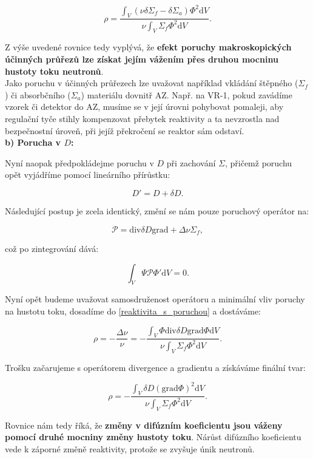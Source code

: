 \begin{equation}
  \boxed{
  \rho = \dfrac{\int_V (\nu \delta \Sigma_f - \delta \Sigma_a) \Phi^2 \text{d}V}{\nu \int_V \Sigma_f \Phi^2 \text{d}V}.
  \label{reaktivita_1G_Sigma}}
\end{equation}

Z výše uvedené rovnice tedy vyplývá, že \textbf{efekt poruchy makroskopických účinných průřezů lze získat jejím vážením přes druhou mocninu hustoty toku neutronů}.\\

Jako poruchu v účinných průřezech lze uvažovat například vkládání štěpného ($\Sigma_f$) či absorbčního ($\Sigma_a$) materiálu dovnitř AZ. Např. na VR-1, pokud zavádíme vzorek či detektor do AZ, musíme se v její úrovni pohybovat pomaleji, aby regulační tyče stihly kompenzovat přebytek reaktivity a ta nevzrostla nad bezpečnostní úroveň, při jejíž překročení se reaktor sám odstaví.\\

\textbf{b) Porucha v $D$:}

Nyní naopak předpokládejme poruchu v $D$ při zachování $\Sigma$, přičemž poruchu opět vyjádříme pomocí lineárního přírůstku:

$$D' = D + \delta D.$$

Následující postup je zcela identický, změní se nám pouze poruchový operátor na:

$$ \mathcal{P} = \text{div} \delta D \text{grad} + \Delta \nu \Sigma_f, $$

což po zintegrování dává:

$$ \int_V \Psi \mathcal{P} \Phi' \text{d}V = 0. $$

Nyní opět budeme uvažovat samosdruženost operátoru a minimální vliv poruchy na hustotu toku, dosadíme do \eqref{reaktivita_s_poruchou} a dostáváme:

$$ \rho = - \dfrac{\Delta \nu}{\nu} = - \dfrac{\int_V \Phi \text{div} \delta D \text{grad} \Phi \text{d}V}{\nu \int_V \Sigma_f \Phi^2 \text{d}V}. $$

Trošku začarujeme s operátorem divergence a gradientu a získáváme finální tvar:

\begin{equation}
  \boxed{
  \rho = - \dfrac{\int_V \delta D (\text{grad}\Phi)^2 \text{d}V}{\nu \int_V \Sigma_f \Phi^2 \text{d}V}.
  \label{reaktivita_1G_D}}
\end{equation}

Rovnice nám tedy říká, že \textbf{změny v difúzním koeficientu jsou váženy pomocí druhé mocniny změny hustoty toku}. Nárůst difúzního koeficientu vede k záporné změně reaktivity, protože se zvyšuje únik neutronů.\\


